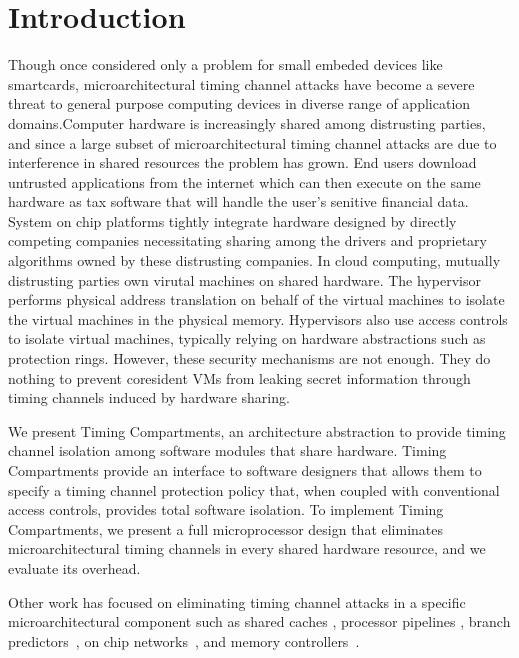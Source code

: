 \section{Introduction}
Though once considered only a problem for small embeded devices like 
smartcards, microarchitectural timing channel attacks have become a severe 
threat to general purpose computing devices in diverse range of application 
domains.Computer hardware is increasingly shared among distrusting parties, and 
since a large subset of microarchitectural timing channel attacks are due to 
interference in shared resources the problem has grown.  End users download 
untrusted applications from the internet which can then execute on the same 
hardware as tax software that will handle the user's senitive financial data.
System on chip platforms tightly integrate hardware designed by directly 
competing companies necessitating sharing among the drivers and proprietary 
algorithms owned by these distrusting companies.
In cloud computing, mutually distrusting parties own virutal machines on shared 
hardware. The hypervisor performs physical address translation on behalf of the 
virtual machines to isolate the virtual machines in the physical memory.  
Hypervisors also use access controls to isolate virtual machines, typically 
relying on hardware abstractions such as protection rings. However, these 
security mechanisms are not enough. They do nothing to prevent coresident VMs 
from leaking secret information through timing channels induced by hardware 
sharing.

We present Timing Compartments, an architecture abstraction to 
provide timing channel isolation among software modules that share hardware.
Timing Compartments provide an interface to software designers that allows them 
to specify a timing channel protection policy that, when coupled with 
conventional access controls, provides total software isolation. To implement 
Timing Compartments, we present a full microprocessor design that eliminates 
microarchitectural timing channels in every shared hardware resource, and we 
evaluate its overhead.

Other work has focused on eliminating timing channel attacks in a specific 
microarchitectural component such as shared caches 
\cite{icache,newcache,deconstructing,cachegames}, processor pipelines 
\cite{pipelines}, branch predictors~\cite{branchpred,predictingbranch}, 
on chip networks~\cite{yaonocs}, and memory controllers~\cite{ushpca14}.
